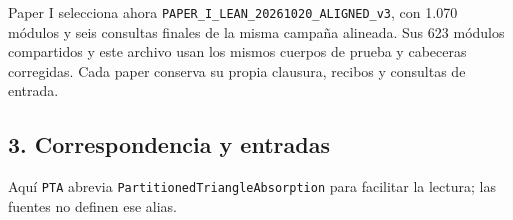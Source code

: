 \documentclass[spanish,11pt,a4paper]{article}
\begin{document}
Paper I selecciona ahora \texttt{PAPER\_\allowbreak{}I\_\allowbreak{}LEAN\allowbreak{}\_\allowbreak{}20261020\_\allowbreak{}AL\allowbreak{}IGNED\_\allowbreak{}v3}, con 1.070 módulos y seis consultas finales de la misma campaña alineada. Sus 623 módulos compartidos y este archivo usan los mismos cuerpos de prueba y cabeceras corregidas. Cada paper conserva su propia clausura, recibos y consultas de entrada.


\subsection{3. Correspondencia y entradas}\label{correspondencia-y-entradas}

Aquí \texttt{PTA} abrevia \texttt{Partitioned\allowbreak{}T\allowbreak{}riangle\allowbreak{}Absor\allowbreak{}ption} para facilitar la lectura; las fuentes no definen ese alias.
\end{document}
